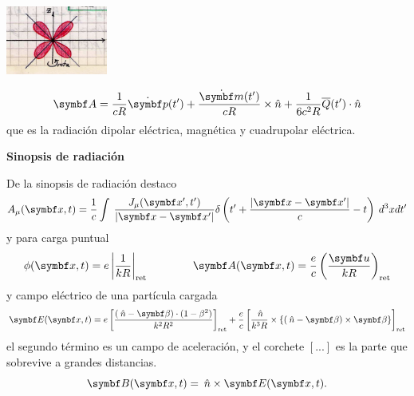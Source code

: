 \documentclass[10pt,oneside]{CBFT_book}
\begin{document}
\includegraphics[width=0.25\textwidth]{images/fig_ft1_trebol_4hojas.jpg}

\[
	\vb{A} = \frac{1}{cR} \dot{\vb{p}}(t') + \frac{\dot{\vb{m}}(t')}{cR} \times \hat{n} + 
	\frac{1}{6c^2R} {\overline{Q}}(t') \cdot \hat{n}
\]
que es la radiación dipolar eléctrica,  magnética y cuadrupolar eléctrica.

\begin{ejemplo}{\bf Sinopsis de radiación}

De la sinopsis de radiación destaco
\[
	A_\mu(\vbx,t) = \frac{1}{c} \int \: \frac{J_\mu(\vbx',t')}{|\vbx-\vbx'|} 
	\delta\left( t' + \frac{|\vbx-\vbx'|}{c} - t \right) \: d^3x dt'
\]
y para carga puntual
\[
	\phi(\vbx,t) = e \left| \frac{1}{kR} \right|_\text{ret} \qquad \qquad 
	\vb{A}(\vbx,t) = \frac{e}{c} \Frac{\vb{u}}{kR}_\text{ret}
\]
y campo eléctrico de una partícula cargada
\[
	\vb{E}(\vbx,t) = e \left[ \frac{ (\nver -\vb{\b} ) \cdot ( 1 - \beta^2 ) }{ k^2 R^2 } \right]_\text{ret} +
	\frac{ e }{ c } \left[ \frac{ \nver }{ k^3 R } \times \{ ( \nver - \vb{\b} ) \times \vb{\b} \} \right]_\text{ret}
\]
el segundo término es un campo de aceleración, y el corchete $[...]$ es la parte que sobrevive
a grandes distancias.
\[
	\vb{B}(\vbx,t) = \nver \times \vb{E}(\vbx,t).
\]
 
\end{ejemplo}
\end{document}

